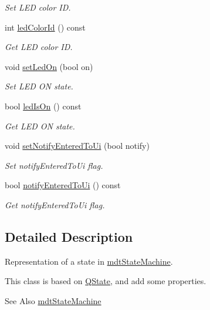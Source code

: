 \begin{DoxyCompactItemize}
\begin{DoxyCompactList}\small\item\em Set L\-E\-D color I\-D. \end{DoxyCompactList}\item 
int \hyperlink{classmdt_state_ab75a482b70c27fb0e585fd1c0c343a6d}{led\-Color\-Id} () const 
\begin{DoxyCompactList}\small\item\em Get L\-E\-D color I\-D. \end{DoxyCompactList}\item 
void \hyperlink{classmdt_state_a6e0bb7e259c160209e41af7d31892648}{set\-Led\-On} (bool on)
\begin{DoxyCompactList}\small\item\em Set L\-E\-D O\-N state. \end{DoxyCompactList}\item 
bool \hyperlink{classmdt_state_a7daacab2967f6f9ab2c0e156e6295545}{led\-Is\-On} () const 
\begin{DoxyCompactList}\small\item\em Get L\-E\-D O\-N state. \end{DoxyCompactList}\item 
void \hyperlink{classmdt_state_a366f2dac01b3a4150c8966d355ecfba7}{set\-Notify\-Entered\-To\-Ui} (bool notify)
\begin{DoxyCompactList}\small\item\em Set notify\-Entered\-To\-Ui flag. \end{DoxyCompactList}\item 
bool \hyperlink{classmdt_state_a8097cd281438cc58b39b9a195076d841}{notify\-Entered\-To\-Ui} () const 
\begin{DoxyCompactList}\small\item\em Get notify\-Entered\-To\-Ui flag. \end{DoxyCompactList}\end{DoxyCompactItemize}


\subsection{Detailed Description}
Representation of a state in \hyperlink{classmdt_state_machine}{mdt\-State\-Machine}. 

This class is based on \hyperlink{class_q_state}{Q\-State}, and add some properties.

\begin{DoxySeeAlso}{See Also}
\hyperlink{classmdt_state_machine}{mdt\-State\-Machine} 
\end{DoxySeeAlso}


